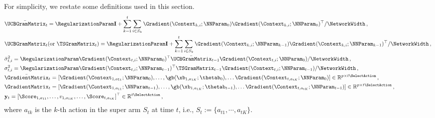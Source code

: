 \documentclass{article}
\theoremstyle{plain}
\begin{document}
\begin{definition}
For simplicity, we restate some definitions used in this section. 
%
    \begin{align*}
        & \bar{\UCBGramMatrix}_t = \RegularizationParam \mathbf{I} + \sum_{k=1}^{t} \sum_{i \in S_k} \Gradient(\Context_{k, i};\NNParam_0) \Gradient(\Context_{k, i};\NNParam_0)^\top / \NetworkWidth \, ,
        \\
        & \UCBGramMatrix_t (\text{or } \TSGramMatrix_t) = \RegularizationParam \mathbf{I} + \sum_{k=1}^{t} \sum_{i \in S_k} \Gradient(\Context_{k, i};\NNParam_{k-1}) \Gradient(\Context_{k, i};\NNParam_{k-1})^\top / \NetworkWidth \, ,
        \\
        & \bar{\sigma}_{t,i}^2 = \RegularizationParam \Gradient(\Context_{t, i};\NNParam_0)^\top \bar{\UCBGramMatrix}_{t-1} \Gradient(\Context_{t, i};\NNParam_0) / \NetworkWidth \, ,
        \\
        & \sigma_{t,i}^2 = \RegularizationParam \Gradient(\Context_{t, i};\NNParam_{t-1})^\top \TSGramMatrix_{t-1} \Gradient(\Context_{t, i};\NNParam_{t-1}) / \NetworkWidth \, ,
        \\
        & \bar{\GradientMatrix}_t = \left[ \Gradient(\Context_{1, a_{11}};\NNParam_0), \ldots, \gb(\xb_{1, a_{1K}}; \thetab_0), \ldots \Gradient(\Context_{t, a_{tK}} ;\NNParam_0) \right] \in \mathbb{R}^{p \times t \SelectAction} \, ,
        \\
        & \GradientMatrix_t = \left[ \Gradient(\Context_{1, a_{11}};\NNParam_{t-1}), \ldots, \gb(\xb_{1, a_{1K}}; \thetab_{t-1}), \ldots \Gradient(\Context_{t, a_{tK}};\NNParam_{t-1}) \right] \in \mathbb{R}^{p \times t \SelectAction} \, ,
        \\
        & \mathbf{y}_t = \left[ \Score_{1, a_{11}}, \ldots, v_{1, a_{1K}}, \ldots , \Score_{t, a_{tK}} \right]^\top \in \mathbb{R}^{t \SelectAction} \, ,
    \end{align*}
%
where $a_{tk}$ is the $k$-th action in the super arm $S_t$ at time $t$, i.e., $S_t:= \{a_{t1}, \cdots, a_{tK} \}$.
\end{definition}
\end{document}
